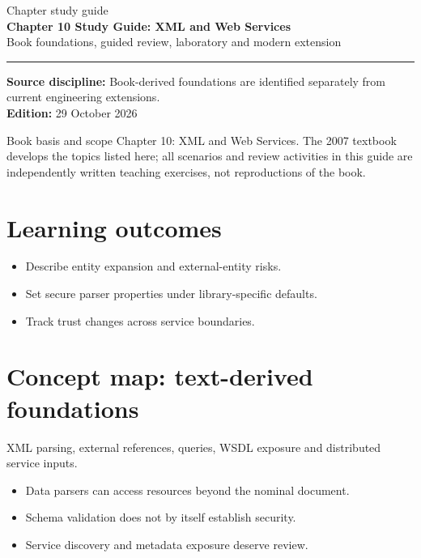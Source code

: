 \documentclass[10pt,letterpaper]{article}
\begin{document}
\hypersetup{pageanchor=false}%
\begin{titlepage}
\vspace*{1.0in}
{\color{bluegray}\Large Chapter study guide}\\[1.0em]
{\color{navy}\Huge\bfseries Chapter 10 Study Guide: XML and Web Services}\\[0.7em]
{\Large Book foundations, guided review, laboratory and modern extension}\\[2.0em]
\rule{\linewidth}{1.0pt}
\vfill
\textbf{Source discipline:} Book-derived foundations are identified separately from current engineering extensions.\\
\textbf{Edition:} 29 October 2026
\end{titlepage}\hypersetup{pageanchor=true}
\tableofcontents
\clearpage
\begin{focusbox}{Book basis and scope}
Chapter 10: XML and Web Services. The 2007 textbook develops the topics listed here; all scenarios and review activities in this guide are independently written teaching exercises, not reproductions of the book.\end{focusbox}
\section{Learning outcomes}
\begin{itemize}
\item Describe entity expansion and external-entity risks.
\item Set secure parser properties under library-specific defaults.
\item Track trust changes across service boundaries.
\end{itemize}

\section{Concept map: text-derived foundations}
XML parsing, external references, queries, WSDL exposure and distributed service inputs.
\begin{itemize}
\item Data parsers can access resources beyond the nominal document.
\item Schema validation does not by itself establish security.
\item Service discovery and metadata exposure deserve review.
\end{itemize}
\end{document}
